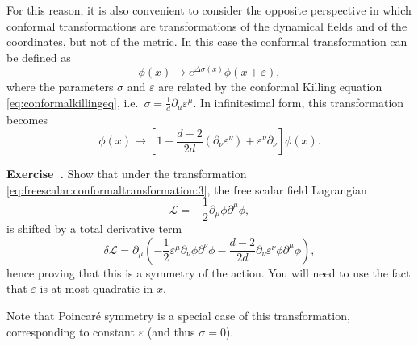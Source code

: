 \documentclass[a4paper,12pt]{article}
\newcommand{\Lagr}{\mathscr{L}}
\numberwithin{equation}{section}
\newcounter{exercise}[section]
\newenvironment{exercise}[1][]%
	{\refstepcounter{exercise}\bigskip
	\begin{mdframed}[backgroundcolor=gray!20, linewidth=0]
	\noindent\textbf{Exercise~\thesection.\theexercise #1} \rmfamily}
  	{\end{mdframed}\bigskip}
\begin{document}
For this reason, it is also convenient to consider the opposite perspective in which conformal transformations are transformations of the dynamical fields and of the coordinates, but not of the metric. In this case the conformal transformation can be defined as
\begin{equation}
	\phi(x) \to e^{\Delta \sigma(x)} \phi(x + \varepsilon),
\end{equation}
where the parameters $\sigma$ and $\varepsilon$ are related by the conformal Killing equation \eqref{eq:conformalkillingeq}, i.e.~$\sigma = \frac{1}{d} \partial_\mu \varepsilon^\mu$. 
In infinitesimal form, this transformation becomes
\begin{equation}
	\phi(x) \to \left[ 1
	+ \frac{d-2}{2d} (\partial_\nu \varepsilon^\nu)
	+ \varepsilon^\nu \partial_\nu \right] \phi(x).
	\label{eq:freescalar:conformaltransformation:3}
\end{equation}
%
\begin{exercise}
	Show that under the transformation
	\eqref{eq:freescalar:conformaltransformation:3},
	the free scalar field Lagrangian
	$$
	\Lagr = - \frac{1}{2} \partial_\mu \phi \partial^\mu \phi,
	$$
	is shifted by a total derivative term
	$$
	\delta\Lagr = \partial_\mu \left( 
	- \frac{1}{2} \varepsilon^\mu \partial_\nu \phi \partial^\nu \phi
	- \frac{d-2}{2d} \partial_\nu \varepsilon^\nu
	\phi \partial^\mu \phi \right),
	$$
	hence proving that this is a symmetry of the action.
	You will need to use the fact that $\varepsilon$
	is at most quadratic in $x$.
\end{exercise}
Note that Poincaré symmetry is a special case of this transformation, corresponding to constant $\varepsilon$ (and thus $\sigma = 0$).
\end{document}

